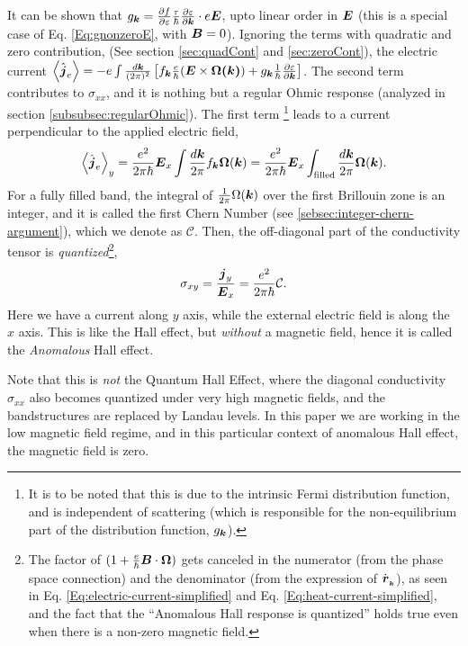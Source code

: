 \documentclass{report}
\renewcommand\vec[1]{\ensuremath\boldsymbol{#1}} %
\begin{document}
It can be shown that  $g_{\vec{k}} = \frac{\partial f} {\partial \varepsilon}
\frac{\tau}{\hbar} \frac{\partial \varepsilon}{\partial \vec{k}}\cdot e \vec{E}$, upto linear order in $\vec{E}$ (this is a special case of Eq. \eqref{Eq:gnonzeroE}, with $\vec{B} = 0$). Ignoring the terms with quadratic and zero contribution, (See section \ref{sec:quadCont} and \ref{sec:zeroCont}), the electric current $\expval{\hat{\vec{j}}_e} = -e \int \frac{d\vec{k}}{(2\pi)^2} \left[{f}_{\vec{k}} \frac{e}{\hbar} (\vec{E}\times\vec{\Omega(\vec{k})}) + {g}_{\vec{k}} \frac{1}{\hbar} \frac{\partial \varepsilon}{\partial \vec{k}}\right] $. The second term contributes to $\sigma_{xx}$, and it is nothing but a regular Ohmic response (analyzed in section \ref{subsubsec:regularOhmic}). The first term \footnote{It is to be noted that this is due to the intrinsic Fermi distribution function, and is independent of scattering (which is responsible for the non-equilibrium part of the distribution function, ${g}_{\vec{k}}$).} leads to a current perpendicular to the applied electric field,
$$\expval{\hat{\vec{j}}_e}_y = \frac{e^2}{2 \pi \hbar} \vec{E}_x \int \frac{d\vec{k}}{2\pi} {f}_{\vec{k}} \vec{\Omega}(\vec{k}) = \frac{e^2}{2 \pi \hbar} \vec{E}_x \int_{\text{filled}} \frac{d\vec{k}}{2\pi} \vec{\Omega}(\vec{k}).$$
For a fully filled band, the integral of $\frac{1}{2\pi}\Omega(\vec{k})$ over the first Brillouin zone is an integer, and it is called the first Chern Number (see \ref{sebsec:integer-chern-argument}), which we denote as $\mathcal{C}$. Then, the off-diagonal part of the conductivity tensor is \textit{quantized}\footnote{The factor of $(1 + \frac{e}{\hbar} \vec{B}\cdot\vec{\Omega})$ gets canceled in the numerator (from the phase space connection) and the denominator (from the expression of $\dot{\vec{r}}_{_{\vec{k}}}$), as seen in Eq. \eqref{Eq:electric-current-simplified} and Eq. \eqref{Eq:heat-current-simplified}, and the fact that the ``Anomalous Hall response is quantized'' holds true even when there is a non-zero magnetic field.},
$$\sigma_{xy} = \frac{\vec{j}_y}{\vec{E}_x} = \frac{e^2}{2\pi \hbar} \mathcal{C}.$$
Here we have a current along $y$ axis, while the external electric field is along the $x$ axis. This is like the Hall effect, but \textit{without} a magnetic field, hence it is called the \textit{Anomalous} Hall effect.

Note that this is \textit{not} the Quantum Hall Effect, where the diagonal conductivity $\sigma_{xx}$ also becomes quantized under very high magnetic fields, and the bandstructures are replaced by Landau levels. In this paper we are working in the low magnetic field regime, and in this particular context of anomalous Hall effect, the magnetic field is zero.
 
\end{document}
